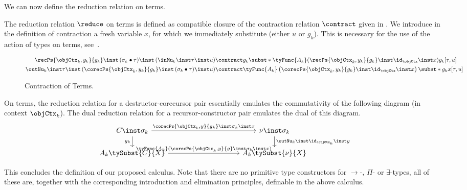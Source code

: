 \documentclass[preprint]{sigplanconf}
\begin{document}
We can now define the reduction relation on terms.
\begin{definition}
  The reduction relation $\reduce$ on terms is defined as compatible closure of
  the contraction relation $\contract$ given in .
  We introduce in the definition of contraction a fresh variable $x$,
  for which we immediately substitute (either $u$ or $g_k$).
  This is necessary for the use of the action of types on terms,
  see~.
  \begin{figure*}
    \vspace*{-0.3cm}
  \begin{align*}
    \recPs{\objCtx_k, y_k}{g_k} \inst \, (\sigma_k \bullet \tau) \inst \,
(\inMu_k \inst \tau \inst u)
    & \contract g_k
    \subst*{\tyFunc{A_k}(\recPs{\objCtx_k, y_k}{g_k}
      \inst \id_{\objCtx} \inst x)}{y_k}
    [\tau, u] \\
\outNu_k \inst \tau \inst \,
    (\corecPs{\objCtx_k, y_k}{g_k} \inst \, (\sigma_k \bullet \tau) \inst u)
    & \contract \tyFunc{A_k}\left(
      \corecPs{\objCtx_k, y_k}{g_k} \inst \id_{\objCtx} \inst x\right)
    \subst*{g_k}{x}
    [\tau, u]
\end{align*}
    \caption{Contraction of Terms.}
    \label{fig:term-contraction}
  \end{figure*}
\end{definition}

\begin{remark}
  On terms, the reduction relation for a destructor-corecursor pair essentially
  emulates the commutativity of the following diagram (in context $\objCtx_k$).
  The dual reduction relation for a recursor-constructor pair emulates the dual
  of this diagram.
\begin{equation*}
  \begin{tikzcd}[row sep=1.5em,column sep=3.5cm]
    C \inst \sigma_k
    \rar{\corecPs{\objCtx_k, y}{g_k} \inst \sigma_k \inst x}
    \dar[swap]{g_k}
    & \nu \inst \sigma_k
    \dar{\outNu_k \inst \id_{\objCtx_k} \inst y} \\
    A_k \tySubst{C}{X}
    \rar{\tyFunc{A_k}(\corecPs{\objCtx_k, y}{g} \inst \sigma_k \inst x)}
    & A_k \tySubst{\nu}{X}
  \end{tikzcd}
\end{equation*}
\end{remark}

This concludes the definition of our proposed calculus.
Note that there are no primitive type constructors for
$\to$-, $\Pi$- or $\exists$-types, all of these are, together with the
corresponding introduction and elimination principles, definable in the above
calculus.
\end{document}

